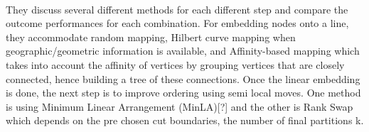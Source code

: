\paragraph{} 

They discuss several different methods for each different step and compare the outcome performances for each combination. For embedding nodes onto a line, they accommodate random mapping, Hilbert curve mapping when geographic/geometric information is available, and Affinity-based mapping which takes into account the affinity of vertices by grouping vertices that are closely connected, hence building a tree of these connections. Once the linear embedding is done, the next step is to improve ordering using semi local moves. One method is using Minimum Linear Arrangement (MinLA)[?] and the other is Rank Swap which depends on the pre chosen cut boundaries, the number of final partitions k.

